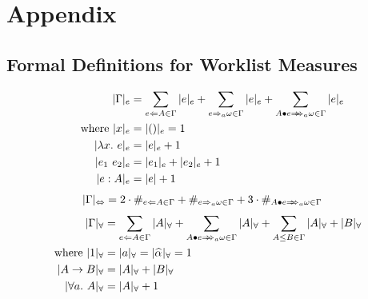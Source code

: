 
\section{Appendix}

\subsection{Formal Definitions for Worklist Measures}

\begin{figure}[h!]
\hfill {} \hfill  {}
\begin{gather*}
    \begin{aligned}
    |\Gm|_e &= \sum_{e\Lto A\in\Gm}|e|_e + \sum_{e\To_a \jg\in\Gm}|e|_e +
        \sum_{\appInfAlg{A}{e}\in\Gm}|e|_e\\
    \text{where } |x|_e &= |()|_e = 1\\
        \qquad |\lam e|_e &= |e|_e + 1\\
        |e_1~e_2|_e &= |e_1|_e + |e_2|_e + 1\\
        |e:A|_e &= |e| + 1
    \end{aligned}
    \end{gather*}
    \hfill \framebox{$|\Gm|_\Leftrightarrow$} \hfill  {}
    \begin{gather*}
    \begin{aligned}
    |\Gm|_\Leftrightarrow &= 2\cdot\#_{e\Lto A\in\Gm} +
        \#_{e\To_a \jg\in\Gm} + 3\cdot\#_{\appInfAlg{A}{e}\in\Gm}
    \end{aligned}
    \end{gather*}
    \hfill \framebox{$|\Gm|_\forall$} \hfill  {}
    \begin{gather*}
    \begin{aligned}
    |\Gm|_\forall &= \sum_{e\Lto A\in\Gm}|A|_\forall + \sum_{\appInfAlg{A}{e}\in\Gm}|A|_\forall +
        \sum_{A\le B\in\Gm} |A|_\forall + |B|_\forall\\
    \text{where } |1|_\forall &= |a|_\forall = |\al|_\forall = 1\\
        |A\to B|_\forall &= |A|_\forall + |B|_\forall\\
        |\all A|_\forall &= |A|_\forall + 1
    \end{aligned}
    \end{gather*}
    \hfill \framebox{$|\Gm|_\to$} \hfill  {}
    \begin{gather*}
    \begin{aligned}

\end{aligned}
\end{gather*}
\end{figure}
